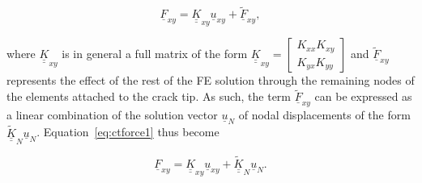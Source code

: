 \documentclass[review]{elsarticle}
\begin{document}
\begin{equation}\label{eq:ctforce1}
\underline{F}_{xy}=\underline{\underline{K}}_{xy}\underline{u}_{xy}+\underline{\widetilde{F}}_{xy},
\end{equation}
 
where $\underline{\underline{K}}_{xy}$ is in general a full matrix of the form $\underline{\underline{K}}_{xy}=\begin{bmatrix}
K_{xx}  K_{xy}\\
K_{yx}  K_{yy}
\end{bmatrix}$ and $\underline{\widetilde{F}}_{xy}$ represents the effect of the rest of the FE solution through the remaining nodes of the elements attached to the crack tip. As such, the term $\underline{\widetilde{F}}_{xy}$ can be expressed as a linear combination of the solution vector $\underline{u}_{N}$ of nodal displacements of the form $\underline{\underline{\widetilde{K}}}_{N}\underline{u}_{N}$. Equation~\ref{eq:ctforce1} thus become

\begin{equation}\label{eq:ctforce2}
\underline{F}_{xy}=\underline{\underline{K}}_{xy}\underline{u}_{xy}+\underline{\underline{\widetilde{K}}}_{N}\underline{u}_{N}.
\end{equation}
\end{document}
